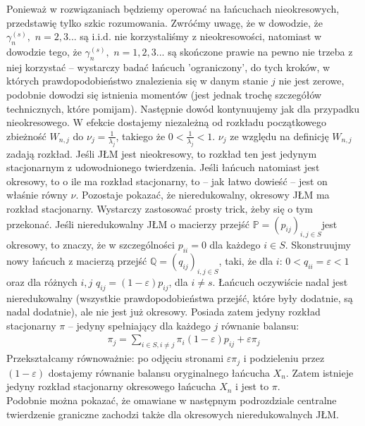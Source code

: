 \documentclass[a4paper]{article}
\begin{document}
Ponieważ w rozwiązaniach będziemy operować na łańcuchach nieokresowych, przedstawię tylko szkic rozumowania. Zwróćmy uwagę, że w dowodzie, że $\gamma_n^{(s)},\,\, n = 2,3...$ są i.i.d. nie korzystaliśmy z nieokresowości, natomiast w dowodzie tego, że $\gamma_n^{(s)},\,\, n = 1,2,3...$ są skończone prawie na pewno nie trzeba z niej korzystać – wystarczy badać łańcuch 'ograniczony', do tych kroków, w których prawdopodobieństwo znalezienia się w danym stanie $j$ nie jest zerowe, podobnie dowodzi się istnienia momentów (jest jednak trochę szczegółów technicznych, które pomijam). Następnie dowód kontynuujemy jak dla przypadku nieokresowego. W efekcie dostajemy niezależną od rozkładu początkowego zbieżność $W_{n,j}$ do $\nu_j = \frac{1}{\lambda_j}$, takiego że $0 < \frac{1}{\lambda_j} < 1$. $\nu_j$ ze względu na definicję $W_{n,j}$ zadają rozkład. Jeśli JŁM jest nieokresowy, to rozkład ten jest jedynym stacjonarnym z udowodnionego twierdzenia. Jeśli łańcuch natomiast jest okresowy, to o ile ma rozkład stacjonarny, to – jak łatwo dowieść – jest on właśnie równy $\nu$. Pozostaje pokazać, że nieredukowalny, okresowy JŁM ma rozkład stacjonarny. Wystarczy zastosować prosty trick, żeby się o tym przekonać. Jeśli nieredukowalny JŁM o macierzy przejść $\mathbb{P} = (p_{ij})_{i,j \in S}$jest okresowy, to znaczy, że w szczególności $p_{ii} = 0$ dla każdego $i \in S$. Skonstruujmy nowy łańcuch z macierzą przejść $\mathbb{Q} = (q_{ij})_{i,j \in S}$, taki, że dla $i$: $0 < q_{ii} = \varepsilon < 1$ oraz dla różnych $i,j$ $q_{ij} = (1-\varepsilon)p_{ij}$, dla $i \neq s$. Łańcuch oczywiście nadal jest nieredukowalny (wszystkie prawdopodobieństwa przejść, które były dodatnie, są nadal dodatnie), ale nie jest już okresowy. Posiada zatem jedyny rozkład stacjonarny $\pi$ – jedyny spełniający dla każdego $j$ równanie balansu:
\begin{align*}
    \pi_j = \sum\limits_{i \in S, i \neq j} \pi_i (1-\varepsilon) p_{ij}  + \varepsilon \pi_j
\end{align*}
Przekształcamy równoważnie: po odjęciu stronami $\varepsilon \pi_j$ i podzieleniu przez $(1-\varepsilon)$ dostajemy równanie balansu oryginalnego łańcucha $X_n$. Zatem istnieje jedyny rozkład stacjonarny okresowego łańcucha $X_n$ i jest to $\pi$.
\\
Podobnie można pokazać, że omawiane w następnym podrozdziale centralne twierdzenie graniczne zachodzi także dla okresowych nieredukowalnych JŁM.
\end{document}
